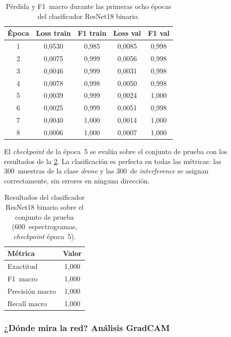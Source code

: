 \begin{table}[htbp]
\centering
\caption{Pérdida y F1~macro durante las primeras ocho épocas del clasificador ResNet18 binario.}
\label{tab:p1_curva}
\begin{tabular}{ccccc}
\toprule
\textbf{Época} & \textbf{Loss train} & \textbf{F1 train} & \textbf{Loss val} & \textbf{F1 val} \\
\midrule
1 & 0,0530 & 0,985 & 0,0085 & 0,998 \\
2 & 0,0075 & 0,999 & 0,0056 & 0,998 \\
3 & 0,0046 & 0,999 & 0,0031 & 0,998 \\
4 & 0,0078 & 0,998 & 0,0050 & 0,998 \\
5 & 0,0039 & 0,999 & 0,0024 & 1,000 \\
6 & 0,0025 & 0,999 & 0,0051 & 0,998 \\
7 & 0,0040 & 1,000 & 0,0014 & 1,000 \\
8 & 0,0006 & 1,000 & 0,0007 & 1,000 \\
\bottomrule
\end{tabular}
\end{table}

El \emph{checkpoint} de la época~5 se evalúa sobre el conjunto de prueba con los resultados de la \cref{tab:p1_test}. La clasificación es perfecta en todas las métricas: las \num{300}~muestras de la clase \emph{drone} y las \num{300}~de \emph{interference} se asignan correctamente, sin errores en ninguna dirección.

\begin{table}[htbp]
\centering
\caption{Resultados del clasificador ResNet18 binario sobre el conjunto de prueba (\num{600}~espectrogramas, \emph{checkpoint} época~5).}
\label{tab:p1_test}
\begin{tabular}{lc}
\toprule
\textbf{Métrica} & \textbf{Valor} \\
\midrule
Exactitud         & 1,000 \\
F1~macro          & 1,000 \\
Precisión macro   & 1,000 \\
Recall macro      & 1,000 \\
\bottomrule
\end{tabular}
\end{table}

\subsubsection{¿Dónde mira la red? Análisis GradCAM}
\label{sec:p1_gradcam}

